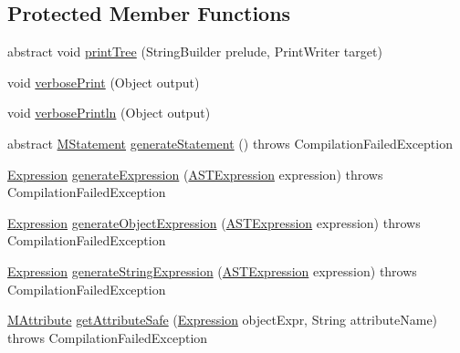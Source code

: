 \subsection*{Protected Member Functions}
\begin{DoxyCompactItemize}
\item 
abstract void \hyperlink{classorg_1_1tzi_1_1use_1_1parser_1_1soil_1_1ast_1_1_a_s_t_statement_a6c24261730bf8b553ea553eee4daf5e6}{print\-Tree} (String\-Builder prelude, Print\-Writer target)
\item 
void \hyperlink{classorg_1_1tzi_1_1use_1_1parser_1_1soil_1_1ast_1_1_a_s_t_statement_a57029e02245dd88db71e05df68f60f59}{verbose\-Print} (Object output)
\item 
void \hyperlink{classorg_1_1tzi_1_1use_1_1parser_1_1soil_1_1ast_1_1_a_s_t_statement_a0f4820196507045874111cf456ada281}{verbose\-Println} (Object output)
\item 
abstract \hyperlink{classorg_1_1tzi_1_1use_1_1uml_1_1sys_1_1soil_1_1_m_statement}{M\-Statement} \hyperlink{classorg_1_1tzi_1_1use_1_1parser_1_1soil_1_1ast_1_1_a_s_t_statement_a604273b15d14460c0a52221e636ecf74}{generate\-Statement} ()  throws Compilation\-Failed\-Exception
\item 
\hyperlink{classorg_1_1tzi_1_1use_1_1uml_1_1ocl_1_1expr_1_1_expression}{Expression} \hyperlink{classorg_1_1tzi_1_1use_1_1parser_1_1soil_1_1ast_1_1_a_s_t_statement_a233956240e6e8daccb34080a32b0cc5c}{generate\-Expression} (\hyperlink{classorg_1_1tzi_1_1use_1_1parser_1_1ocl_1_1_a_s_t_expression}{A\-S\-T\-Expression} expression)  throws Compilation\-Failed\-Exception 
\item 
\hyperlink{classorg_1_1tzi_1_1use_1_1uml_1_1ocl_1_1expr_1_1_expression}{Expression} \hyperlink{classorg_1_1tzi_1_1use_1_1parser_1_1soil_1_1ast_1_1_a_s_t_statement_a5e2ab09859adcfdd498a780d25ee727c}{generate\-Object\-Expression} (\hyperlink{classorg_1_1tzi_1_1use_1_1parser_1_1ocl_1_1_a_s_t_expression}{A\-S\-T\-Expression} expression)  throws Compilation\-Failed\-Exception 
\item 
\hyperlink{classorg_1_1tzi_1_1use_1_1uml_1_1ocl_1_1expr_1_1_expression}{Expression} \hyperlink{classorg_1_1tzi_1_1use_1_1parser_1_1soil_1_1ast_1_1_a_s_t_statement_a6895defb3b95ca7098336ada8bd1338f}{generate\-String\-Expression} (\hyperlink{classorg_1_1tzi_1_1use_1_1parser_1_1ocl_1_1_a_s_t_expression}{A\-S\-T\-Expression} expression)  throws Compilation\-Failed\-Exception 
\item 
\hyperlink{classorg_1_1tzi_1_1use_1_1uml_1_1mm_1_1_m_attribute}{M\-Attribute} \hyperlink{classorg_1_1tzi_1_1use_1_1parser_1_1soil_1_1ast_1_1_a_s_t_statement_a4bcb219867e09283722cf37311c14352}{get\-Attribute\-Safe} (\hyperlink{classorg_1_1tzi_1_1use_1_1uml_1_1ocl_1_1expr_1_1_expression}{Expression} object\-Expr, String attribute\-Name)  throws Compilation\-Failed\-Exception 

\end{DoxyCompactItemize}
